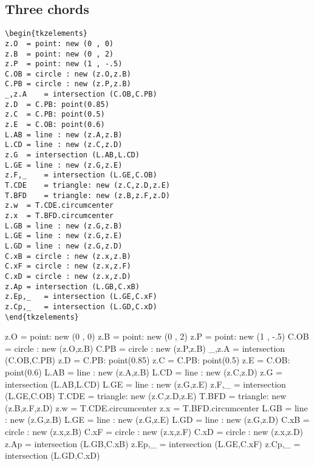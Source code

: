 \subsection{Three chords} %
\label{sub:three_chords}

\begin{Verbatim}
\begin{tkzelements}
z.O  = point: new (0 , 0)
z.B  = point: new (0 , 2)
z.P  = point: new (1 , -.5)
C.OB = circle : new (z.O,z.B)
C.PB = circle : new (z.P,z.B)
_,z.A    = intersection (C.OB,C.PB)
z.D  = C.PB: point(0.85)
z.C  = C.PB: point(0.5)
z.E  = C.OB: point(0.6)
L.AB = line : new (z.A,z.B)
L.CD = line : new (z.C,z.D)
z.G  = intersection (L.AB,L.CD)
L.GE = line : new (z.G,z.E)
z.F,_    = intersection (L.GE,C.OB)
T.CDE    = triangle: new (z.C,z.D,z.E)
T.BFD    = triangle: new (z.B,z.F,z.D)
z.w  = T.CDE.circumcenter
z.x  = T.BFD.circumcenter
L.GB = line : new (z.G,z.B)
L.GE = line : new (z.G,z.E)
L.GD = line : new (z.G,z.D)
C.xB = circle : new (z.x,z.B)
C.xF = circle : new (z.x,z.F)
C.xD = circle : new (z.x,z.D)
z.Ap = intersection (L.GB,C.xB)
z.Ep,_   = intersection (L.GE,C.xF)
z.Cp,_   = intersection (L.GD,C.xD)
\end{tkzelements}
\end{Verbatim}


\begin{tkzelements}
z.O  = point: new (0 , 0)
z.B  = point: new (0 , 2)
z.P  = point: new (1 , -.5)
C.OB = circle : new (z.O,z.B)
C.PB = circle : new (z.P,z.B)
_,z.A    = intersection (C.OB,C.PB)
z.D  = C.PB: point(0.85)
z.C  = C.PB: point(0.5)
z.E  = C.OB: point(0.6)
L.AB = line : new (z.A,z.B)
L.CD = line : new (z.C,z.D)
z.G  = intersection (L.AB,L.CD)
L.GE = line : new (z.G,z.E)
z.F,_    = intersection (L.GE,C.OB)
T.CDE    = triangle: new (z.C,z.D,z.E)
T.BFD    = triangle: new (z.B,z.F,z.D)
z.w  = T.CDE.circumcenter
z.x  = T.BFD.circumcenter
L.GB = line : new (z.G,z.B)
L.GE = line : new (z.G,z.E)
L.GD = line : new (z.G,z.D)
C.xB = circle : new (z.x,z.B)
C.xF = circle : new (z.x,z.F)
C.xD = circle : new (z.x,z.D)
z.Ap = intersection (L.GB,C.xB)
z.Ep,_   = intersection (L.GE,C.xF)
z.Cp,_   = intersection (L.GD,C.xD)
\end{tkzelements}

